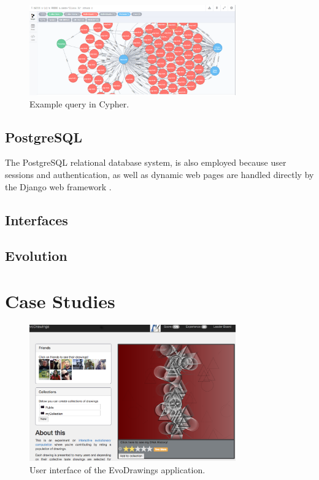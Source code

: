   \begin{figure}[!t]
    \centering
        \includegraphics[width=3.5in]{img/gui-neo.png}
    \caption{Example query in Cypher.}
    \label{fig:cypher}
  \end{figure}

\subsection{PostgreSQL}
  The PostgreSQL relational database system, is also employed because user sessions and authentication,
  as well as dynamic web pages are handled directly by the Django web framework \cite{garcia2013evospace}.

\subsection{Interfaces}
    
\subsection{Evolution}

\section{Case Studies}
\label{sec:experiments}

\begin{figure}[!t]
    \centering
        \includegraphics[width=3.5in]{img/interface.png}
    \caption{User interface of the EvoDrawings application.}
    \label{fig:web}
\end{figure}

